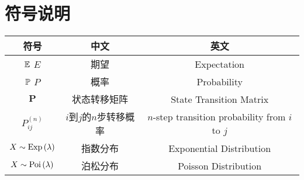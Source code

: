 \appendix
\clearpage
\section{符号说明}
\begin{table}[H]
	\centering
	\begin{tabular}{ccc}
		\toprule
		符号                    & 中文               & 英文                                              \\
		\midrule
		$\mathbb{E}$ $E$              & 期望               & Expectation                                     \\
		$\mathbb{P}$ $P$              & 概率               & Probability                                     \\
		$\bm{P}$              & 状态转移矩阵           & State Transition Matrix                         \\
		$P_{ij}^{(n)}$        & $i$到$j$的$n$步转移概率 & $n$-step transition probability from $i$ to $j$ \\
		$X\sim \text{Exp}\,(\lambda)$ & 指数分布             & Exponential Distribution                        \\
		$X\sim \text{Poi}\,(\lambda)$ & 泊松分布             & Poisson Distribution                            \\
		\bottomrule
	\end{tabular}
\end{table}

